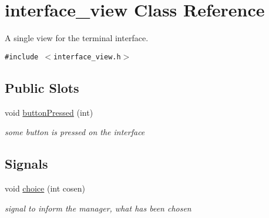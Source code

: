 \hypertarget{classinterface__view}{
\section{interface\_\-view Class Reference}
\label{classinterface__view}
}
A single view for the terminal interface.  


{\tt \#include $<$interface\_\-view.h$>$}

\subsection*{Public Slots}
\begin{CompactItemize}
\item 
\hypertarget{classinterface__view_2cbfdb9bdf8d47fd9a381df0bc67f434}{
void \hyperlink{classinterface__view_2cbfdb9bdf8d47fd9a381df0bc67f434}{buttonPressed} (int)}
\label{classinterface__view_2cbfdb9bdf8d47fd9a381df0bc67f434}

\begin{CompactList}\small\item\em some button is pressed on the interface \item\end{CompactList}\end{CompactItemize}
\subsection*{Signals}
\begin{CompactItemize}
\item 
\hypertarget{classinterface__view_3539e6da0e6f70096c07ecb1ba27727a}{
void \hyperlink{classinterface__view_3539e6da0e6f70096c07ecb1ba27727a}{choice} (int cosen)}
\label{classinterface__view_3539e6da0e6f70096c07ecb1ba27727a}

\begin{CompactList}\small\item\em signal to inform the manager, what has been chosen \item\end{CompactList}\end{CompactItemize}
